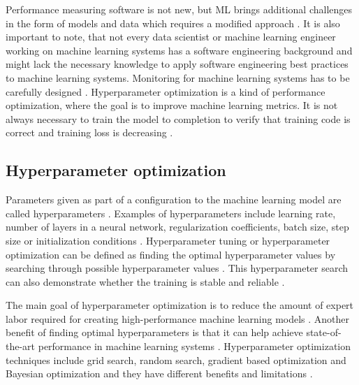 Performance measuring software is not new, but ML brings additional challenges in the form of models and data which requires a modified approach \parencite{breckMLTestScore2017a}. It is also important to note, that not every data scientist or machine learning engineer working on machine learning systems has a software engineering background \parencite{finzerDataScienceEducation2013} and might lack the necessary knowledge to apply software engineering best practices to machine learning systems. Monitoring for machine learning systems has to be carefully designed \parencite{sculleyHiddenTechnicalDebt2015a}. Hyperparameter optimization is a kind of performance optimization, where the goal is to improve machine learning metrics. It is not always necessary to train the model to completion to verify that training code is correct and training loss is decreasing \parencite{breckMLTestScore2017a}.


\subsection{Hyperparameter optimization}


Parameters given as part of a configuration to the machine learning model are called hyperparameters \parencite{yangHyperparameterOptimizationMachine2020}. Examples of hyperparameters include learning rate, number of layers in a neural network, regularization coefficients, batch size, step size or initialization conditions \parencite{maclaurinGradientbasedHyperparameterOptimization2015,bakerAcceleratingNeuralArchitecture2017,breckMLTestScore2017a}. Hyperparameter tuning or hyperparameter optimization can be defined as finding the optimal hyperparameter values by searching through possible hyperparameter values \parencite{bakerAcceleratingNeuralArchitecture2017}. This hyperparameter search can also demonstrate whether the training is stable and reliable \parencite{breckMLTestScore2017a}.

The main goal of hyperparameter optimization is to reduce the amount of expert labor required for creating high-performance machine learning models \parencite{bakerAcceleratingNeuralArchitecture2017}.
Another benefit of finding optimal hyperparameters is that it can help achieve state-of-the-art performance in machine learning systems \parencite{maclaurinGradientbasedHyperparameterOptimization2015}.
Hyperparameter optimization techniques include grid search, random search, gradient based optimization and Bayesian optimization and they have different benefits and limitations \parencite{yangHyperparameterOptimizationMachine2020}.

